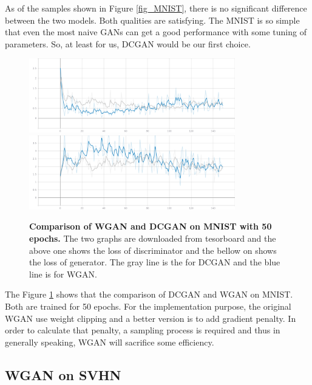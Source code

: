 \documentclass{article}
\newcommand{\mycaption}[2]{\caption[#1]{\textbf{#1.} #2}}
\begin{document}
As of the samples shown in Figure \ref{fig_MNIST}, there is no significant difference between the two models. Both qualities are satisfying. The MNIST is so simple that even the most naive GANs can get a good performance with some tuning of parameters. So, at least for us, DCGAN would be our first choice. 

\begin{figure}[!htb]
  \centering
  \includegraphics[width=0.8\textwidth]{imgs/mnist-train-discriminator-loss.png}
  \includegraphics[width=0.8\textwidth]{imgs/mnist-train-generator-loss.png}
  \mycaption{Comparison of WGAN and DCGAN on MNIST with 50 epochs}{The two graphs are downloaded from tesorboard and the above one shows the loss of discriminator and the bellow on shows the loss of generator. The gray line is the for DCGAN and the blue line is for WGAN.}  
  \label{fig_GANs_MNIST}
\end{figure}

The Figure \ref{fig_GANs_MNIST} shows that the comparison of DCGAN and WGAN on MNIST. Both are trained for 50 epochs. For the implementation purpose, the original WGAN use weight clipping and a better version is to add gradient penalty. In order to calculate that penalty, a sampling process is required and thus in generally speaking, WGAN will sacrifice some efficiency. 

\newpage
\subsection{WGAN on SVHN}
\end{document}
